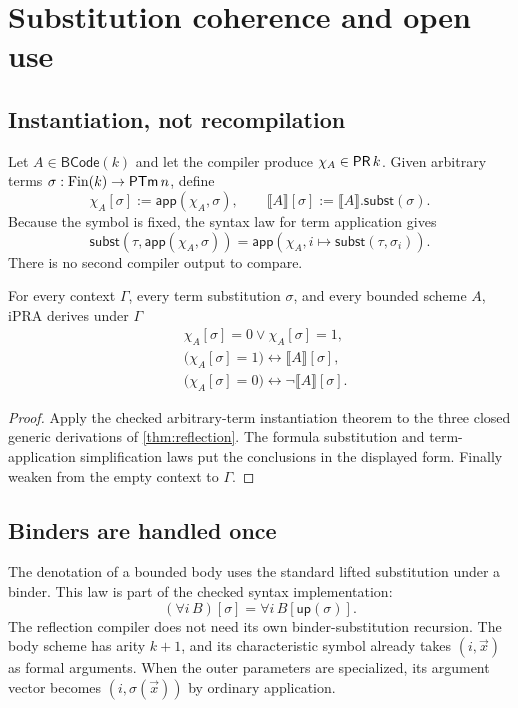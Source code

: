 \section{Substitution coherence and open use}
\label{sec:naturality}

\subsection{Instantiation, not recompilation}

Let \(A\in\mathsf{BCode}(k)\) and let the compiler produce
\(\chi_A\in\mathsf{PR}\,k\).  Given arbitrary terms
\(\sigma:\mathrm{Fin}(k)\to\mathsf{PTm}\,n\), define
\[
  \chi_A[\sigma] := \mathsf{app}(\chi_A,\sigma),
  \qquad
  \llbracket A\rrbracket[\sigma]
     := \llbracket A\rrbracket.\mathsf{subst}(\sigma).
\]
Because the symbol is fixed, the syntax law for term application gives
\[
 \mathsf{subst}(\tau,\mathsf{app}(\chi_A,\sigma))
   = \mathsf{app}(\chi_A, i\mapsto\mathsf{subst}(\tau,\sigma_i)).
\]
There is no second compiler output to compare.

\begin{theorem}
\label{thm:open-reflection}
For every context \(\Gamma\), every term substitution \(\sigma\), and every
bounded scheme \(A\), iPRA derives under \(\Gamma\)
\begin{align*}
 &\chi_A[\sigma]=0\vee\chi_A[\sigma]=1,\\
 &\bigl(\chi_A[\sigma]=1\bigr)
       \leftrightarrow\llbracket A\rrbracket[\sigma],\\
 &\bigl(\chi_A[\sigma]=0\bigr)
       \leftrightarrow\neg\llbracket A\rrbracket[\sigma].
\end{align*}
\end{theorem}

\begin{proof}
Apply the checked arbitrary-term instantiation theorem  to the
three closed generic derivations of \cref{thm:reflection}.  The formula
substitution and term-application simplification laws put the conclusions in
the displayed form.  Finally weaken from the empty context to \(\Gamma\).
\end{proof}

\subsection{Binders are handled once}

The denotation of a bounded body uses the standard lifted substitution under a
binder.  This law is part of the checked syntax implementation:
\[
  (\forall i\,B)[\sigma]
    = \forall i\,B[\mathsf{up}(\sigma)].
\]
The reflection compiler does not need its own binder-substitution recursion.
The body scheme has arity \(k+1\), and its characteristic symbol already takes
\((i,\vec x)\) as formal arguments.  When the outer parameters are specialized,
its argument vector becomes \((i,\sigma(\vec x))\) by ordinary application.

